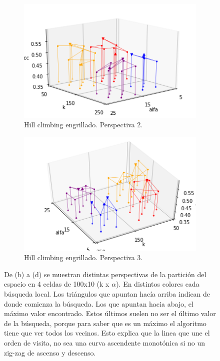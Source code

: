 \begin{figure}[ht]
\begin{subfigure}{.5\textwidth}
\begin{center}
      \includegraphics[width=1.0\textwidth]{./img/hillclimbing-2.png}
    \end{center}
    \caption{Hill climbing engrillado. Perspectiva 2.}
    \label{fig:hill-2}
  \end{subfigure}
  \begin{subfigure}{0.5\textwidth}
    \begin{center}
      \includegraphics[width=1.0\textwidth]{./img/hillclimbing-3.png}
    \end{center}
    \caption{Hill climbing engrillado. Perspectiva 3.}
    \label{fig:hill-3}
  \end{subfigure}
  \caption{De (b) a (d) se muestran distintas perspectivas de la
    partición del espacio en 4 celdas de 100x10 (k x $\alpha$). En
    distintos colores cada búsqueda local. Los triángulos que apuntan
    hacía arriba indican de donde comienza la búsqueda. Los que
    apuntan hacia abajo, el máximo valor encontrado. Estos últimos
    suelen no ser el último valor de la búsqueda, porque para saber
    que es un máximo el algoritmo tiene que ver todos los
    vecinos. Esto explica que la linea que une el orden de visita, no
    sea una curva ascendente monotónica si no un zig-zag de ascenso y
    descenso.}
\end{figure}

